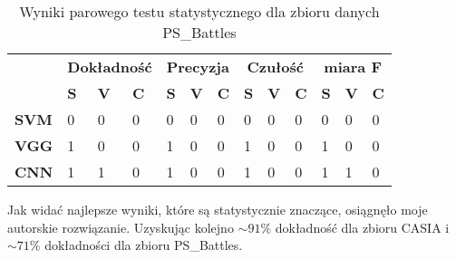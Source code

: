 \begin{table}[h!]
	\centering
	\begin{tabular}{l|l|l|l|l|l|l|l|l|l|l|l|l|}
		\cline{2-13}
		&
		\multicolumn{3}{c|}{\textbf{Dokładność}} &
		\multicolumn{3}{c|}{\textbf{Precyzja}} &
		\multicolumn{3}{c|}{\textbf{Czułość}} &
		\multicolumn{3}{c|}{\textbf{miara F}} \\ \cline{2-13} 
		&
		\textbf{S} &
		\textbf{V} &
		\textbf{C} &
		\textbf{S} &
		\textbf{V} &
		\textbf{C} &
		\textbf{S} &
		\textbf{V} &
		\textbf{C} &
		\textbf{S} &
		\textbf{V} &
		\textbf{C} \\ \hline
		\multicolumn{1}{|l|}{\textbf{SVM}} & 0 & 0 & 0 & 0 & 0 & 0 & 0 & 0 & 0 & 0 & 0 & 0 \\ \hline
		\multicolumn{1}{|l|}{\textbf{VGG}} & 1 & 0 & 0 & 1 & 0 & 0 & 1 & 0 & 0 & 1 & 0 & 0 \\ \hline
		\multicolumn{1}{|l|}{\textbf{CNN}} & 1 & 1 & 0 & 1 & 0 & 0 & 1 & 0 & 0 & 1 & 1 & 0 \\ \hline
	\end{tabular}
	\caption{Wyniki parowego testu statystycznego dla zbioru danych PS\_Battles}
	\label{tab:t_results_p}
\end{table}

Jak widać najlepsze wyniki, które są statystycznie znaczące, osiągnęło moje autorskie rozwiązanie. Uzyskując kolejno $\sim91\%$ dokładność dla zbioru CASIA i $\sim71\%$ dokładności dla zbioru PS\_Battles.

